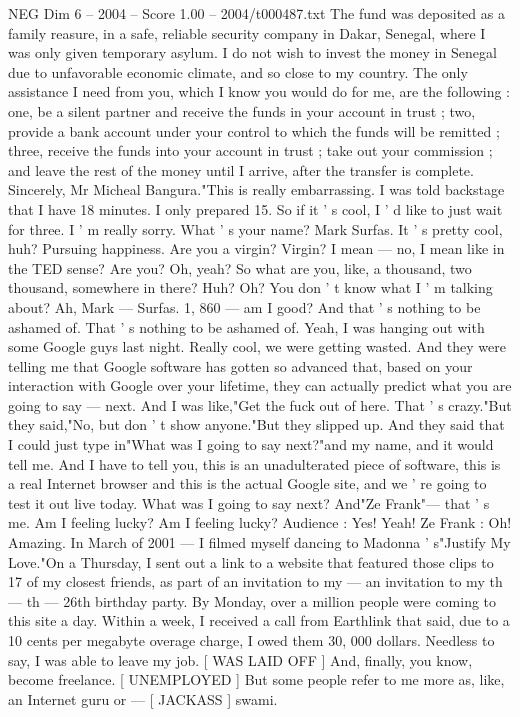 \begin{textsample}{NEG Dim 6 – 2004 – Score 1.00 – 2004/t000487.txt}
The fund was deposited as a family reasure, in a safe, reliable security company in Dakar, Senegal, where I was only given temporary asylum.
I do not wish to invest the money in Senegal due to unfavorable economic climate, and so close to my country.
The only assistance I need from you, which I know you would do for me, are the following : one, be a silent partner and receive the funds in your account in trust ; two, provide a bank account under your control to which the funds will be remitted ; three, receive the funds into your account in trust ; take out your commission ; and leave the rest of the money until I arrive, after the transfer is complete.
Sincerely, Mr Micheal Bangura."This is really embarrassing.
I was told backstage that I have 18 minutes.
I only prepared 15.
So if it ' s cool, I ' d like to just wait for three.
I ' m really sorry.
What ' s your name?
Mark Surfas.
It ' s pretty cool, huh?
Pursuing happiness.
Are you a virgin?
Virgin?
I mean — no, I mean like in the TED sense?
Are you?
Oh, yeah?
So what are you, like, a thousand, two thousand, somewhere in there?
Huh?
Oh?
You don ' t know what I ' m talking about?
Ah, Mark — Surfas. 1, 860 — am I good?
And that ' s nothing to be ashamed of.
That ' s nothing to be ashamed of.
Yeah, I was hanging out with some Google guys last night.
Really cool, we were getting wasted.
And they were telling me that Google software has gotten so advanced that, based on your interaction with Google over your lifetime, they can actually predict what you are going to say — next.
And I was like,"Get the fuck out of here.
That ' s crazy."But they said,"No, but don ' t show anyone."But they slipped up.
And they said that I could just type in"What was I going to say next?"and my name, and it would tell me.
And I have to tell you, this is an unadulterated piece of software, this is a real Internet browser and this is the actual Google site, and we ' re going to test it out live today.
What was I going to say next?
And"Ze Frank"— that ' s me.
Am I feeling lucky?
Am I feeling lucky?
Audience : Yes!
Yeah!
Ze Frank : Oh!
Amazing.
In March of 2001 — I filmed myself dancing to Madonna ' s"Justify My Love."On a Thursday, I sent out a link to a website that featured those clips to 17 of my closest friends, as part of an invitation to my — an invitation to my th — th — 26th birthday party.
By Monday, over a million people were coming to this site a day.
Within a week, I received a call from Earthlink that said, due to a 10 cents per megabyte overage charge, I owed them 30, 000 dollars.
Needless to say, I was able to leave my job. [ WAS LAID OFF ] And, finally, you know, become freelance. [ UNEMPLOYED ] But some people refer to me more as, like, an Internet guru or — [ JACKASS ] swami.

\end{textsample}
